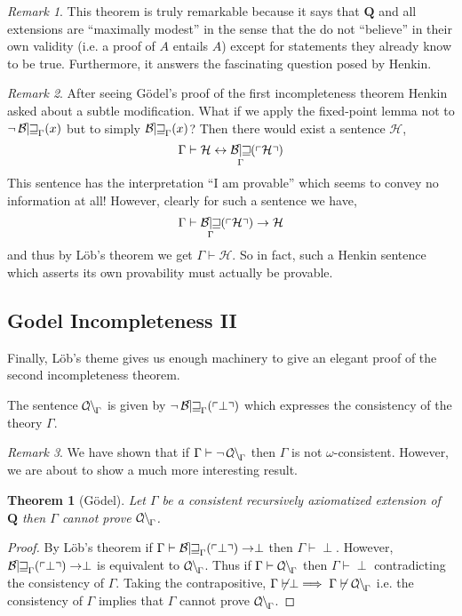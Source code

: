 \documentclass[12pt, leqno]{article}
\renewcommand{\bf}[1]{\mathbf{#1}}
\newcommand{\proves}{\vdash}
\newenvironment{definition}[1][Definition:]{\begin{trivlist}
\item[\hskip \labelsep {\bfseries #1}]}{\end{trivlist}}
\theoremstyle{theorem}
\newtheorem{theorem}{Theorem}[section]
\theoremstyle{definition}
\theoremstyle{definition}
\theoremstyle{remark}
\theoremstyle{definition}
\theoremstyle{remark}
\newtheorem{remark}{Remark}[subsection]
\DeclareMathOperator{\Bew}{\mathcal{B\mkern-2.0mu e\mkern-2.0mu w\mkern-1mu}}
\DeclareMathOperator{\Con}{\mathcal{C\mkern-3mu o\mkern-1mu n\mkern-1.5mu}}
\newcommand{\Gterm}[1]{\left\ulcorner #1 \right\urcorner}
\newcommand{\Thm}[1]{\Bew_{\Gamma}(\Gterm{#1})}
\begin{document}
\begin{remark}
This theorem is truly remarkable because it says that $\bf{Q}$ and all extensions are ``maximally modest'' in the sense that the do not ``believe'' in their own validity (i.e. a proof of $A$ entails $A$) except for statements they already know to be true. Furthermore, it answers the fascinating question posed by Henkin. 
\end{remark}

\begin{remark}
After seeing G\"{o}del's proof of the first incompleteness theorem Henkin asked about a subtle modification. What if we apply the fixed-point lemma not to $\neg \Bew_{\Gamma}(x)$ but to simply $\Bew_{\Gamma}(x)$? Then there would exist a sentence $\mathcal{H}$,
\[ \Gamma \proves \mathcal{H} \leftrightarrow \Thm{\mathcal{H}} \]
This sentence has the interpretation ``I am provable'' which seems to convey no information at all! However, clearly for such a sentence we have,
\[ \Gamma \proves \Thm{\mathcal{H}} \to \mathcal{H} \]
and thus by L\"{o}b's theorem we get $\Gamma \proves \mathcal{H}$. So in fact, such a Henkin sentence which asserts its own provability must actually be provable.  
\end{remark}

\subsection{Godel Incompleteness II}

Finally, L\"{o}b's theme gives us enough machinery to give an elegant proof of the second incompleteness theorem. 

\begin{definition}
The sentence $\Con_{\Gamma}$ is given by $\neg \Thm{\perp}$ which expresses the consistency of the theory $\Gamma$.
\end{definition}

\begin{remark}
We have shown that if $\Gamma \proves \neg \Con_{\Gamma}$ then $\Gamma$ is not $\omega$-consistent. However, we are about to show a much more interesting result.
\end{remark}

\begin{theorem}[G\"{o}del]
Let $\Gamma$ be a consistent recursively axiomatized extension of $\bf{Q}$ then $\Gamma$ cannot prove $\Con_{\Gamma}$. 
\end{theorem}

\begin{proof}
By L\"{o}b's theorem if $\Gamma \proves \Thm{\perp} \to \perp$ then $\Gamma \proves \perp$. However, $\Thm{\perp} \to \perp$ is equivalent to $\Con_{\Gamma}$. Thus if $\Gamma \proves \Con_{\Gamma}$ then $\Gamma \proves \perp$ contradicting the consistency of $\Gamma$. Taking the contrapositive, $\Gamma \not\proves \perp \implies \Gamma \not\proves \Con_{\Gamma}$ i.e. the consistency of $\Gamma$ implies  that $\Gamma$ cannot prove $\Con_{\Gamma}$.
\end{proof}
\end{document}
